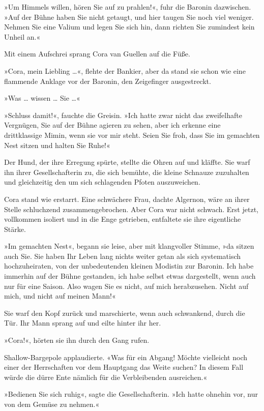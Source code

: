 »Um Himmels willen, hören Sie auf zu prahlen!«, fuhr die Baronin
dazwischen. »Auf der Bühne haben Sie nicht getaugt, und hier taugen
Sie noch viel weniger. Nehmen Sie eine Valium und legen Sie sich
hin, dann richten Sie zumindest kein Unheil an.«

\bigpar

Mit einem Aufschrei sprang Cora van Guellen auf die Füße.

»Cora, mein Liebling \ldots{}«, flehte der Bankier, aber da stand sie
schon wie eine flammende Anklage vor der Baronin, den Zeigefinger
ausgestreckt.

»Was \ldots{} wissen \ldots{} Sie \ldots{}«

»Schluss damit!«, fauchte die Greisin. »Ich hatte zwar nicht das
zweifelhafte Vergnügen, Sie auf der Bühne agieren zu sehen, aber
ich erkenne eine drittklassige Mimin, wenn sie vor mir steht. Seien
Sie froh, dass Sie im gemachten Nest sitzen und halten Sie Ruhe!«

Der Hund, der ihre Erregung spürte, stellte die Ohren auf und
kläffte. Sie warf ihn ihrer Gesellschafterin zu, die sich bemühte,
die kleine Schnauze zuzuhalten und gleichzeitig den um sich
schlagenden Pfoten auszuweichen.

Cora stand wie erstarrt. Eine schwächere Frau, dachte Algernon,
wäre an ihrer Stelle schluchzend zusammengebrochen. Aber Cora war
nicht schwach. Erst jetzt, vollkommen isoliert und in die Enge
getrieben, entfaltete sie ihre eigentliche Stärke.

»Im gemachten Nest«, begann sie leise, aber mit klangvoller Stimme,
»da sitzen auch Sie. Sie haben Ihr Leben lang nichts weiter getan
als sich systematisch hochzuheiraten, von der unbedeutenden kleinen
Modistin zur Baronin. Ich habe immerhin auf der Bühne gestanden,
ich habe selbst etwas dargestellt, wenn auch nur für eine Saison.
Also wagen Sie es nicht, auf mich herabzusehen. Nicht auf mich, und
nicht auf meinen Mann!«

Sie warf den Kopf zurück und marschierte, wenn auch schwankend,
durch die Tür. Ihr Mann sprang auf und eilte hinter ihr her.

»Cora!«, hörten sie ihn durch den Gang rufen.

\bigpar

Shallow-Bargepole applaudierte. «Was für ein Abgang! Möchte
vielleicht noch einer der Herrschaften vor dem Hauptgang das Weite
suchen? In diesem Fall würde die dürre Ente nämlich für die
Verbleibenden ausreichen.«

»Bedienen Sie sich ruhig«, sagte die Gesellschafterin. »Ich hatte
ohnehin vor, nur von dem Gemüse zu nehmen.«

